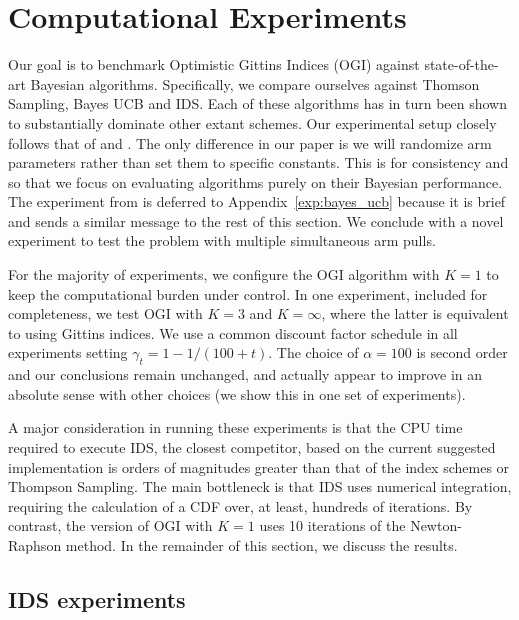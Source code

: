 \section{Computational Experiments} \label{sec:experiments}
Our goal is to benchmark Optimistic Gittins Indices (OGI) against state-of-the-art Bayesian algorithms. Specifically, we compare ourselves against Thomson Sampling, Bayes UCB and IDS. Each of these algorithms has in turn been shown to substantially dominate other extant schemes. Our experimental setup closely follows that of \cite{russo2014learning,kaufmann2012thompson} and \cite{chapelle2011empirical}. The only difference in our paper is we will randomize arm parameters rather than set them to specific constants. This is for consistency and so that we focus on evaluating algorithms purely on their Bayesian performance. The experiment from \cite{kaufmann2012thompson} is deferred to Appendix~\ref{exp:bayes_ucb} because it is brief and sends a similar message to the rest of this section. We conclude with a novel experiment to test the problem with multiple simultaneous arm pulls.

For the majority of experiments, we configure the OGI algorithm with $K =1$ to keep the computational burden under control. In one experiment, included for completeness, we test OGI with $K = 3$ and $K=\infty$, where the latter is equivalent to using Gittins indices. We use a common discount factor schedule in all experiments setting $\gamma_t = 1 - 1/(100 + t)$. The choice of $\alpha = 100$ is second order and our conclusions remain unchanged, and actually appear to improve in an absolute sense with other choices (we show this in one set of experiments). 

A major consideration in running these experiments is that the CPU time required to execute IDS, the closest competitor, based on the current suggested implementation is orders of magnitudes greater than that of the index schemes or Thompson Sampling. The main bottleneck is that IDS uses numerical integration,  requiring the calculation of a CDF over, at least, hundreds of iterations. By contrast, the version of OGI with $K=1$ uses 10 iterations of the Newton-Raphson method. In the remainder of this section, we discuss the results.

\subsection{IDS experiments}

